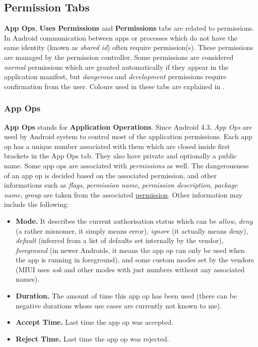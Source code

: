 \subsection{Permission Tabs}\label{subsec:permission-tabs}
\textbf{App Ops}, \textbf{Uses Permissions} and \textbf{Permissions} tabs are related to permissions. In Android
communication between apps or processes which do not have the same identity (known as \textit{shared id}) often require
permission(s). These permissions are managed by the permission controller. Some permissions are considered
\textit{normal} permissions which are granted automatically if they appear in the application manifest, but
\textit{dangerous} and \textit{development} permissions require confirmation from the user. Colours used in these tabs
are explained in .

\subsubsection{App Ops}
\textbf{App Ops} stands for \textbf{Application Operations}. Since Android 4.3, \textit{App Ops} are used by Android
system to control most of the application permissions. Each app op has a unique number associated with them which are
closed inside first brackets in the App Ops tab. They also have private and optionally a public name. Some app ops are
associated with \textit{permissions} as well. The dangerousness of an app op is decided based on the associated
permission, and other informations such as \textit{flags}, \textit{permission name}, \textit{permission description},
\textit{package name}, \textit{group} are taken from the associated \hyperref[subsubsec:permissions]{permission}. Other
information may include the following:
\begin{itemize}
    \item \textbf{Mode.} It describes the current authorisation status which can be \textit{allow}, \textit{deny} (a
    rather misnomer, it simply means error), \textit{ignore} (it actually means deny), \textit{default} (inferred from
    a list of defaults set internally by the vendor), \textit{foreground} (in newer Androids, it means the app op can
    only be used when the app is running in foreground), and some custom modes set by the vendors (MIUI uses
    \textit{ask} and other modes with just numbers without any associated names).

    \item \textbf{Duration.} The amount of time this app op has been used (there can be negative durations whose use
    cases are currently not known to me).

    \item \textbf{Accept Time.} Last time the app op was accepted.

    \item \textbf{Reject Time.} Last time the app op was rejected.
\end{itemize}

